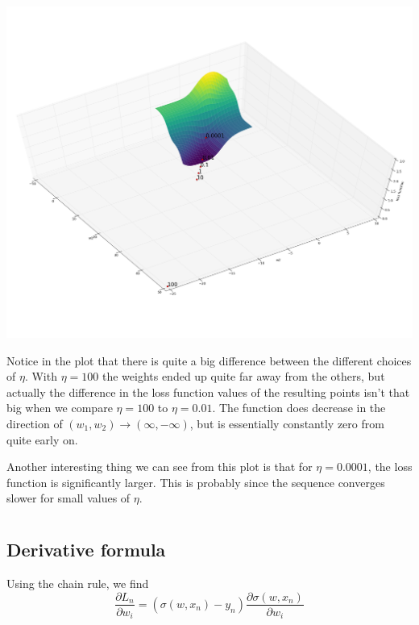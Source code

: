 \documentclass{article}
\begin{document}
\begin{centering}
	\includegraphics[width=\linewidth]{exercise4_task13.png}
\end{centering}

Notice in the plot that there is quite a big difference between the different choices of $\eta$. With $\eta = 100$ the weights ended up quite far away from the others, but actually the difference in the loss function values of the resulting points isn't that big when we compare $\eta = 100$ to $\eta = 0.01$. 
The function does decrease in the direction of $(w_1,w_2) \rightarrow (\infty,-\infty)$, but is essentially constantly zero from quite early on. 

Another interesting thing we can see from this plot is that for $\eta=0.0001$, the loss function is significantly larger. This is probably since the sequence converges slower for small values of $\eta$. 

\section{}
\subsection{Derivative formula}
Using the chain rule, we find
\begin{equation} 
	\frac{\partial L_n}{\partial w_i} = (\sigma(w,x_n) - y_n) \frac{\partial \sigma(w,x_n)}{\partial w_i} \label{eq:partial_L_halway}
\end{equation}
\end{document}
